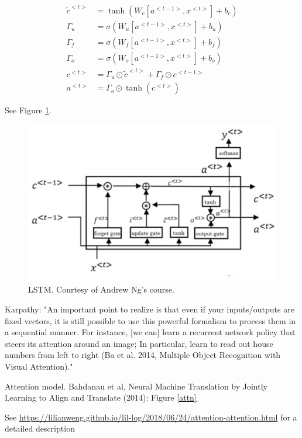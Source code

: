 \documentclass[english]{article}
\begin{document}
\begin{align*}
\tilde c^{<t>} &= \tanh(W_c [a^{<t-1>},x^{<t>}]+b_c)\\
\Gamma_u &= \sigma(W_u [a^{<t-1>},x^{<t>}]+b_u)\\
\Gamma_f &= \sigma(W_f [a^{<t-1>},x^{<t>}]+b_f)\\
\Gamma_o &= \sigma(W_o [a^{<t-1>},x^{<t>}]+b_o)\\
c^{<t>} & = \Gamma_u \odot \tilde c^{<t>} + \Gamma_f \odot c^{<t-1>}\\
a^{<t>} & = \Gamma_o \odot \tanh(c^{<t>})
\end{align*}

See Figure \ref{lstm}. 

\begin{figure}
  \centering
  \includegraphics[scale=0.3]{lstm.png}
    \caption{LSTM. Courtesy of Andrew Ng's course.}
    \label{lstm}
\end{figure}


\item  Karpathy: "An important point to realize is that even if your inputs/outputs are fixed vectors, it is still possible to use this powerful formalism to process them in a sequential manner. For instance, [we can] learn a recurrent network policy that steers its attention around an image; In particular, learn to read out house numbers from left to right (Ba et al. 2014, Multiple Object Recognition with Visual Attention)."

\item Attention model. Bahdanau et al, Neural Machine Translation by Jointly Learning to Align and Translate (2014): Figure \ref{attn}

See \url{https://lilianweng.github.io/lil-log/2018/06/24/attention-attention.html} for a detailed description
\end{document}

